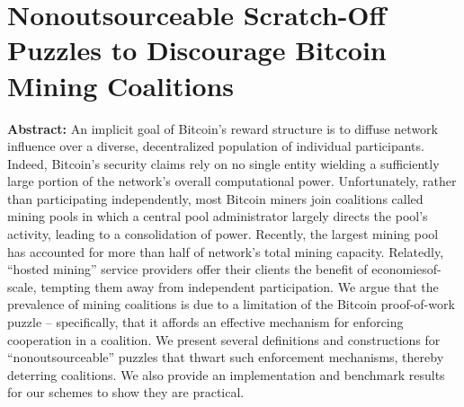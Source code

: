 \section{Nonoutsourceable Scratch-Off Puzzles to Discourage Bitcoin Mining Coalitions }

\textbf{Abstract:} 
An implicit goal of Bitcoin’s reward structure is to diffuse network influence over a diverse, decentralized population of individual participants. Indeed, Bitcoin’s security claims rely on no single entity wielding a sufficiently large portion of the network’s overall computational power. Unfortunately, rather than participating independently, most Bitcoin miners join coalitions called mining pools in which a central pool administrator largely directs the pool’s activity, leading to a consolidation of power. Recently, the largest mining pool has accounted for more than half of network’s total mining capacity. Relatedly, “hosted mining” service providers offer their clients the benefit of economiesof-scale, tempting them away from independent participation. We argue that the prevalence of mining coalitions is due to a limitation of the Bitcoin proof-of-work puzzle – specifically, that it affords an effective mechanism for enforcing cooperation in a coalition. We present several definitions and constructions for “nonoutsourceable” puzzles that thwart such enforcement mechanisms, thereby deterring coalitions. We also provide an implementation and benchmark results for our schemes to show they are practical.

